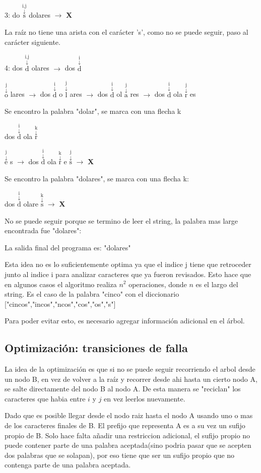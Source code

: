 \documentclass{article}
\newcommand{\flecha}[2] {
    \!\!$\overset{\text{#1}}{\overset{\downarrow}{\text{#2}}}$\!\!
}
\begin{document}
{\color{green} 3:} do\flecha{i,j}sdolares $\rightarrow$ {\color{red} \textbf X}

La raíz no tiene una arista con el carácter 's', como no se puede seguir, paso al carácter siguiente.

{\color{violet} 4:} dos\flecha{i,j}dolares $\rightarrow$ dos\flecha{i}d\flecha{j}olares $\rightarrow$ dos\flecha i do\flecha j lares
$\rightarrow$ dos\flecha i dol\flecha j ares $\rightarrow$ dos\flecha i dola\flecha j res

Se encontro la palabra "dolar", se marca con una flecha k

dos\flecha i dola\flecha k r\flecha j es $\rightarrow$ dos\flecha i dola\flecha k r e\flecha j s $\rightarrow$ {\color{red}\textbf{X}}

Se encontro la palabra "dolares", se marca con una flecha k:

dos\flecha i dolare\flecha k s $\rightarrow$ {\color{red}\textbf{X}}

No se puede seguir porque se termino de leer el string, la palabra mas large encontrada fue "dolares":

La salida final del programa es: "dolares"

Esta idea no es lo suficientemente optima ya que el indice j tiene que retroceder junto al indice i para analizar caracteres que
ya fueron revisados. Esto hace que en algunos casos el algoritmo realiza $n^2$ operaciones, donde $n$ es el largo del string. Es el caso
de la palabra "cinco" con el diccionario ["cincos","incos","ncos","cos","os","s"]

Para poder evitar esto, es necesario agregar información adicional en el árbol.

\subsection*{Optimización: transiciones de falla}

La idea de la optimización es que si no se puede seguir recorriendo el arbol desde un nodo B, en vez de volver a la raíz y recorrer desde ahi hasta un cierto nodo A,
se salte directamente del nodo B al nodo A. De esta manera se "reciclan" los caracteres que habia entre $i$ y $j$ en vez leerlos nuevamente.

Dado que es posible llegar desde el nodo raiz hasta el nodo A usando uno o mas de los caracteres finales de B. El prefijo que representa A es a su vez
un sufijo propio de B. Solo hace falta añadir una restriccion adicional, el sufijo propio no puede contener parte de una palabra aceptada(sino podria pasar que se acepten dos palabras que se solapan),
por eso tiene que ser un sufijo propio que no contenga parte de una palabra aceptada.
\end{document}
